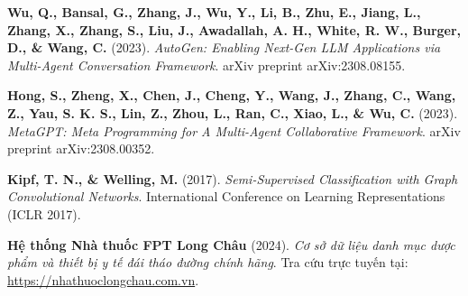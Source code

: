 \documentclass[12pt,a4paper]{article}
\begin{document}
\begin{enumerate}[label={[\arabic*]}, leftmargin=1.2cm, itemsep=4pt]
    \item \textbf{Wu, Q., Bansal, G., Zhang, J., Wu, Y., Li, B., Zhu, E., Jiang, L., Zhang, X., Zhang, S., Liu, J., Awadallah, A. H., White, R. W., Burger, D., \& Wang, C.} (2023). \textit{AutoGen: Enabling Next-Gen LLM Applications via Multi-Agent Conversation Framework}. arXiv preprint arXiv:2308.08155.
    
    \item \textbf{Hong, S., Zheng, X., Chen, J., Cheng, Y., Wang, J., Zhang, C., Wang, Z., Yau, S. K. S., Lin, Z., Zhou, L., Ran, C., Xiao, L., \& Wu, C.} (2023). \textit{MetaGPT: Meta Programming for A Multi-Agent Collaborative Framework}. arXiv preprint arXiv:2308.00352.
    
    \item \textbf{Kipf, T. N., \& Welling, M.} (2017). \textit{Semi-Supervised Classification with Graph Convolutional Networks}. International Conference on Learning Representations (ICLR 2017).
    
    \item \textbf{Hệ thống Nhà thuốc FPT Long Châu} (2024). \textit{Cơ sở dữ liệu danh mục dược phẩm và thiết bị y tế đái tháo đường chính hãng}. Tra cứu trực tuyến tại: \url{https://nhathuoclongchau.com.vn}.
\end{enumerate}
\end{document}
